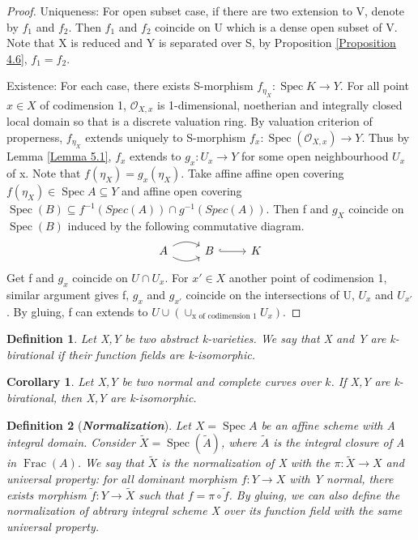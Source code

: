 \documentclass{ctexart}
\newtheorem{definition}{Definition}[section]
\newtheorem{corollary}{Corollary}[section]
\newcommand{\spec}{\operatorname{Spec}}
\newcommand{\fraction}{\operatorname{Frac}}
\begin{document}
\begin{proof}
    Uniqueness: For open subset case, if there are two extension to V, denote by $f_{1}$ and $f_{2}$.
    Then $f_{1}$ and $f_{2}$ coincide on U which is a dense open subset of V.
    Note that X is reduced and Y is separated over S, by Proposition \ref{Proposition 4.6}, $f_{1} = f_{2}$.
    \par
    Existence: For each case, there exists S-morphism $f_{\eta_{X}}: \spec K \longrightarrow Y$.
    For all point $x\in X$ of codimension 1, $\mathcal{O}_{X, x}$ is 1-dimensional, noetherian and integrally closed local domain so that is a discrete valuation ring.
    By valuation criterion of properness, $f_{\eta_{X}}$ extends uniquely to S-morphism $f_{x}: \spec(\mathcal{O}_{X, x}) \longrightarrow Y$.
    Thus by Lemma \ref{Lemma 5.1}, $f_{x}$ extends to $g_{x}: U_{x} \longrightarrow Y$ for some open neighbourhood $U_{x}$ of x.
    Note that $f(\eta_{X}) = g_{x}(\eta_{X})$.
    Take affine affine open covering $f(\eta_{X})\in \spec A \subseteq Y$ and affine open covering $\spec(B) \subseteq f^{-1}(Spec(A)) \cap g^{-1}(Spec(A))$.
    Then f and $g_{X}$ coincide on $\spec(B)$ induced by the following commutative diagram.
    \begin{equation*}
        \begin{tikzcd}
            A \arrow[r, bend left] \arrow[r, bend right] &
            B \arrow[r, hookrightarrow] &
            K
        \end{tikzcd}
    \end{equation*}
    Get f and $g_{x}$ coincide on $U \cap U_{x}$.
    For $x'\in X$ another point of codimension 1, similar argument gives f, $g_{x}$ and $g_{x'}$ coincide on the intersections of U, $U_{x}$ and $U_{x'}$.
    By gluing, f can extends to $U \cup (\cup_{\text{x of codimension 1}} U_{x})$.
\end{proof}
\begin{definition}
    Let X,Y be two abstract k-varieties.
    We say that X and Y are k-birational if their function fields are k-isomorphic.
\end{definition}
\begin{corollary}
    Let X,Y be two normal and complete curves over $k$.
    If X,Y are k-birational, then X,Y are k-isomorphic.
    \label{Corollary 5.2}
\end{corollary}
\begin{definition}[\textbf{\emph{Normalization}}]
    Let $X = \spec A$ be an affine scheme with A integral domain.
    Consider $\widetilde{X} = \spec(\widetilde{A})$, where $\widetilde{A}$ is the integral closure of A in $\fraction(A)$.
    We say that $\widetilde{X}$ is the normalization of X with the $\pi: \widetilde{X} \longrightarrow X$ and universal property:
    for all dominant morphism $f: Y \longrightarrow X$ with Y normal, there exists morphism $\widetilde{f}: Y \longrightarrow \widetilde{X}$ such that $f = \pi \circ \widetilde{f}$.
    By gluing, we can also define the normalization of abtrary integral scheme X over its function field with the same universal property.
\end{definition}
\end{document}
